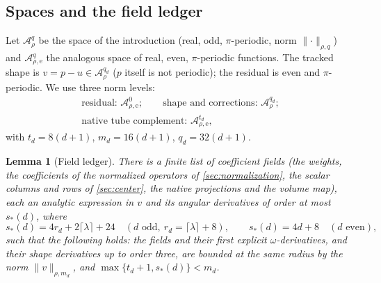 \documentclass[11pt]{amsart}
\numberwithin{equation}{section}
\newtheorem{lemma}[theorem]{Lemma}
\theoremstyle{definition}
\theoremstyle{remark}
\newcommand{\norm}[1]{\lVert #1\rVert}
\newcommand{\Wn}{\mathcal A}
\begin{document}
\subsection{Spaces and the field ledger}
Let $\Wn^q_\rho$ be the space of the introduction (real, odd, $\pi$-periodic, norm $\norm\cdot_{\rho,q}$) and $\Wn^q_{\rho,\mathrm e}$ the analogous space of real, even, $\pi$-periodic functions. The tracked shape is $v=p-u\in\Wn^{q_d}_\rho$ ($p$ itself is not periodic); the residual is even and $\pi$-periodic. We use three norm levels:
\begin{gather*}
\text{residual: }\Wn^0_{\rho,\mathrm e};\qquad\text{shape and corrections: }\Wn^{q_d}_\rho;\\
\text{native tube complement: }\Wn^{t_d}_{\rho,\mathrm e},
\end{gather*}
with $t_d=8(d+1)$, $m_d=16(d+1)$, $q_d=32(d+1)$.

\begin{lemma}[Field ledger]\label{lem:ledger}
There is a finite list of coefficient fields (the weights, the coefficients of the normalized operators of \cref{sec:normalization}, the scalar columns and rows of \cref{sec:center}, the native projections and the volume map), each an analytic expression in $v$ and its angular derivatives of order at most $s_*(d)$, where
\[
s_*(d)=4r_d+2\lceil\lambda\rceil+24\quad(d\text{ odd},\ r_d=\lceil\lambda\rceil+8),\qquad s_*(d)=4d+8\quad(d\text{ even}),
\]
such that the following holds: the fields and their first explicit $\omega$-derivatives, and their shape derivatives up to order three, are bounded at the same radius by the norm $\norm v_{\rho,m_d}$, and $\max\{t_d+1,s_*(d)\}<m_d$.
\end{lemma}
\end{document}

